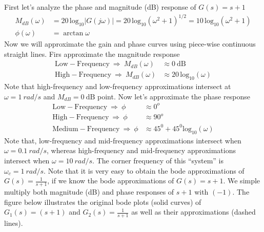 \documentclass[twoside]{article}
\begin{document}
First let's analyze the phase and magnitude (dB) response of $G(s) = s + 1$
%
\begin{align*}
  M_{dB} (\omega) &= 20 \, \mathrm{log}_{10} | G( j \omega) | = 20 \, \mathrm{log}_{10} \left( \omega^2 + 1 \right)^{1/2} = 10 \, \mathrm{log}_{10} \left( \omega^2 + 1 \right)
  \\
  \phi(\omega) &= \arctan \omega                                    
\end{align*}
%
Now we will approximate the gain and phase curves using piece-wise continuous straight lines. 
Firs approximate the magnitude response
%
\begin{align*}
  \mathrm{Low-Frequency} \ \Rightarrow \ M_{dB}(\omega)  &\approx 0 \
                                                   \mathrm{dB} \\
  \mathrm{High-Frequency} \ \Rightarrow \ M_{dB}(\omega)  &\approx 20 \,
                                                    \mathrm{log}_{10} ( \omega )
\end{align*}
%
Note that high-frequency and low-frequency approximations intersect at
$\omega = 1 \ rad/s$ and $M_{dB} = 0 \ \mathrm{dB}$ point. Now 
let's approximate the phase response
%
\begin{align*}
  \mathrm{Low-Frequency} \ \Rightarrow \ \phi  &\approx 0^o  \\
  \mathrm{High-Frequency} \ \Rightarrow \ \phi &\approx 90^o \\
  \mathrm{Medium-Frequency} \ \Rightarrow \ \phi & \approx 45^0 + 45^0 \mathrm{log}_{10} ( \omega)
\end{align*}
%
Note that, low-frequency and mid-frequency approximations intersect when $\omega = 0.1 \ rad/s$,
whereas high-frequency and mid-frequency approximations intersect when $\omega = 10 \ rad/s$.
The corner frequency of this ``system'' is $\omega_c = 1 \ rad/s$. Note that it is very easy to obtain 
the bode approximations of $G(s) = \frac{1}{s+1}$, if we know the bode approximations of $G(s) = s+1$. We
simple multiply both magnitude (dB) and phase responses of $s+1$ with $(-1)$. The figure below
illustrates the original bode plots (solid curves) of $G_1(s) = (s+1)$ and $G_2(s) = \frac{1}{s+1}$ as well as
their approximations (dashed lines). 

\vspace{6 pt}
\end{document}
